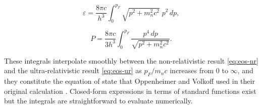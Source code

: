 \begin{equation}
    \varepsilon
      = \frac{8\pi c}{h^3}
        \int_0^{p_F} \sqrt{p^2 + m_n^2 c^2}\; p^2\,dp,
    \label{eq:energy-density-rel}
\end{equation}

\begin{equation}
    P = \frac{8\pi c}{3h^3}
        \int_0^{p_F}
        \frac{p^4\,dp}{\sqrt{p^2 + m_n^2 c^2}}.
    \label{eq:pressure-rel}
\end{equation}

These integrals interpolate smoothly between the non-relativistic result
\eqref{eq:eos-nr} and the ultra-relativistic result \eqref{eq:eos-ur} as
$p_F / m_n c$ increases from $0$ to $\infty$, and they constitute the
equation of state that Oppenheimer and Volkoff used in their original
calculation \cite{Oppy}. Closed-form expressions in terms of
standard functions exist \cite{Chandrasekhar1935} but the integrals are
straightforward to evaluate numerically.